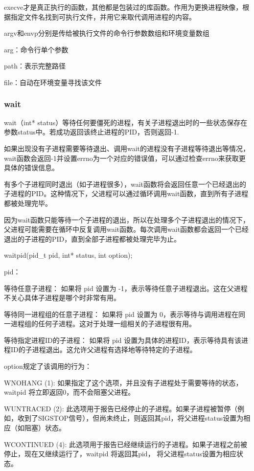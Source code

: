 \documentclass{ctexart}
\begin{document}
execve才是真正执行的函数，其他都是包装过的库函数。作用为更换进程映像，根据指定文件名找到可执行文件，并用它来取代调用进程的内容。

argv和envp分别是传给被执行文件的命令行参数数组和环境变量数组

arg：命令行单个参数

path：表示完整路径

file：自动在环境变量寻找该文件

\subsubsection{wait}
wait（int* status）等待任何要僵死的进程，有关子进程退出时的一些状态保存在参数status中。若成功返回该终止进程的PID，否则返回-1.

如果出现没有子进程需要等待退出、调用wait的进程没有子进程等待退出等情况，wait函数会返回-1并设置errno为一个对应的错误值，可以通过检查errno来获取更具体的错误信息。

有多个子进程同时退出（如子进程很多），wait函数将会返回任意一个已经退出的子进程的PID。这种情况下，父进程可以通过循环调用wait函数，直到所有子进程都被处理完毕。

因为wait函数只能等待一个子进程的退出，所以在处理多个子进程退出的情况下，父进程可能需要在循环中反复调用wait函数。每次调用wait函数都会返回一个已经退出的子进程的PID，直到全部子进程都被处理完毕为止。

waitpid(pid\_t pid, int* status, int option); 

pid：

等待任意子进程： 如果将 pid 设置为 -1，表示等待任意子进程退出。这在父进程不关心具体子进程是哪个时非常有用。

等待同一进程组的任意子进程： 如果将 pid 设置为 0，表示等待与调用进程在同一进程组的任何子进程。这对于处理一组相关的子进程很有用。

等待指定进程ID的子进程： 如果将 pid 设置为具体的进程ID，表示等待具有该进程ID的子进程退出。这允许父进程有选择地等待特定的子进程。

option规定了该调用的行为：

WNOHANG (1): 如果指定了这个选项，并且没有子进程处于需要等待的状态，waitpid 将立即返回0，而不会阻塞父进程。

WUNTRACED (2): 此选项用于报告已经停止的子进程。如果子进程被暂停（例如，收到了SIGSTOP信号），但尚未终止，则返回其pid，将父进程status设置为相应（如阻塞）状态。

WCONTINUED (4): 此选项用于报告已经继续运行的子进程。如果子进程之前被停止，现在又继续运行了，waitpid 将返回其pid， 将父进程status设置为相应状态。
\end{document}
